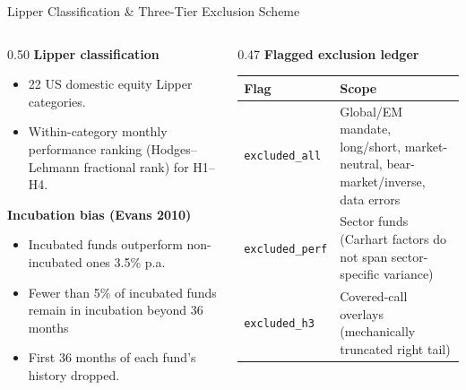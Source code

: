 \documentclass[10pt, aspectratio=169]{beamer}
\begin{document}
\begin{frame}{Lipper Classification \& Three-Tier Exclusion Scheme}
  \begin{columns}[T]
    \begin{column}{0.50\textwidth}
      \textbf{Lipper classification}
      \begin{itemize}\itemsep3pt
        \item 22 US domestic equity Lipper categories.
        \item Within-category monthly performance ranking (Hodges–Lehmann fractional rank) for H1–H4.
      \end{itemize}
      \vspace{5pt}
      \textbf{Incubation bias (Evans 2010)}\\
      \begin{itemize}
      \item Incubated funds outperform non-incubated ones 3.5\% p.a.\\[2pt]
      \item Fewer than 5\% of incubated funds remain in incubation beyond 36 months\\[2pt]
      \item First 36 months of each fund's history dropped.\\[2pt]
      \end{itemize}
    \end{column}
    \begin{column}{0.47\textwidth}
      \textbf{Flagged exclusion ledger}
      \vspace{4pt}\\
      \scriptsize
\begin{tabular}{@{}lp{4.2cm}@{}}
  \toprule
  Flag & Scope \\
  \midrule
  \texttt{excluded\_all}  & Global/EM mandate, long/short, market-neutral, bear-market/inverse, data errors \\[2pt]
  \texttt{excluded\_perf} & Sector funds (Carhart factors do not span sector-specific variance) \\[2pt]
  \texttt{excluded\_h3}   & Covered-call overlays (mechanically truncated right tail) \\
  \bottomrule
\end{tabular}
    \end{column}
  \end{columns}
\end{frame}
\end{document}

